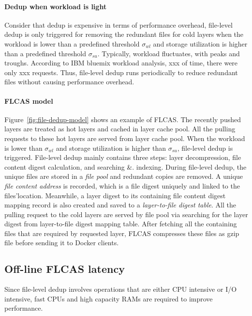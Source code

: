 \paragraph{Dedup when workload is light}Consider that dedup is expensive in terms of performance overhead, file-level dedup is only triggered for removing the redundant files for cold layers when the workload is lower than a predefined threshold $\sigma_{wl}$ and storage utilization is higher than a predefined threshold $\sigma_{su}$. 
Typically, workload fluctuates, with peaks and troughs. According to IBM bluemix workload analysis\cite{xxx}, xxx of time, there were only xxx requests. %
Thus, file-level dedup runs periodically to reduce redundant files without causing performance overhead. 

\paragraph{FLCAS model}
Figure~\ref{fig:file-dedup-model} shows an example of FLCAS. The recently pushed layers are treated as hot layers and cached in layer cache pool. 
All the pulling requests to these hot layers are served from layer cache pool.
When the workload is lower than $\sigma_{wl}$ and storage utilization is higher than $\sigma_{su}$, file-level dedup is triggered. 
File-level dedup mainly contains three steps: layer decompression, file content digest calculation, and searching \&. indexing.
During file-level dedup, the unique files are stored in a \textit{file pool} and redundant copies are removed.  
A unique \textit{file content address} is recorded, which is a
file digest uniquely and linked to the files'location.
Meanwhile, a layer digest to its containing file content digest mapping record is also created and saved to a \textit{layer-to-file digest table}. 
 All the pulling request to the cold layers are served by file pool via searching for the layer digest from layer-to-file digest mapping table. After fetching all the containing files that are required by requested layer, FLCAS compresses these files as gzip file before sending it to Docker clients.         

\subsection{Off-line FLCAS latency} 

Since file-level dedup involves operations that are either CPU intensive or I/O intensive, fast CPUs and high capacity RAMs are required to improve performance.

